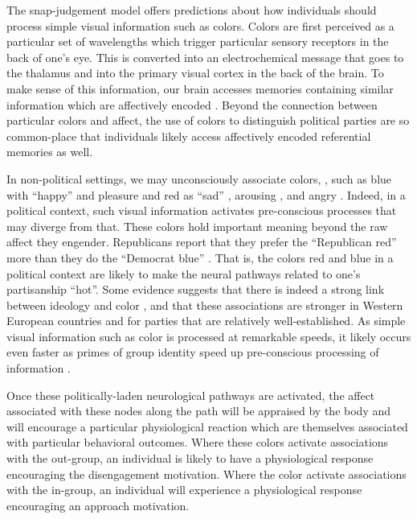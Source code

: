\documentclass [12pt]{article}
\begin{document}
The snap-judgement model offers predictions about how individuals should process simple visual information such as colors. Colors are first perceived as a particular set of wavelengths which trigger particular sensory receptors in the back of one's eye. This is converted into an electrochemical message that goes to the thalamus and into the primary visual cortex in the back of the brain. To make sense of this information, our brain accesses memories containing similar information which are affectively encoded \citep{cimbalo_et-al_1978_jgp}. Beyond the connection between particular colors and affect, the use of colors to distinguish political parties are so common-place that individuals likely access affectively encoded referential memories as well.

In non-political settings, we may unconsciously associate colors, \citep[see][]{mehta_zhu_2009_s}, such as blue with ``happy'' and pleasure and red as ``sad'' \citep{d'andrade_egan_1974_ae}, arousing \citep{valdez_mehrabian_1994, mehta_zhu_2009_s, elliot_maier_2012_aesp}, and angry \citep{epps_kaya_2004, elliot_maier_2012_aesp}. Indeed, in a political context, such visual information activates pre-conscious processes that may diverge from that. These colors hold important meaning beyond the raw affect they engender. Republicans report that they prefer the ``Republican red'' more than they do the ``Democrat blue'' \citep{schloss_palmer_2014_pbr}. That is, the colors red and blue in a political context are likely to make the neural pathways related to one's partisanship ``hot''. Some evidence suggests that there is indeed a strong link between ideology and color \citep{casiraghi_et-al_2022_pp}, and that these associations are stronger in Western European countries and for parties that are relatively well-established. As simple visual information such as color is processed at remarkable speeds, it likely occurs even faster as primes of group identity speed up pre-conscious processing of information \citep{lodge_taber_2013_cup}. 

Once these politically-laden neurological pathways are activated, the affect associated with these nodes along the path will be appraised by the body and will encourage a particular physiological reaction which are themselves associated with particular behavioral outcomes. Where these colors activate associations with the out-group, an individual is likely to have a physiological response encouraging the disengagement motivation. Where the color activate associations with the in-group, an individual will experience a physiological response encouraging an approach motivation. 
\end{document}

